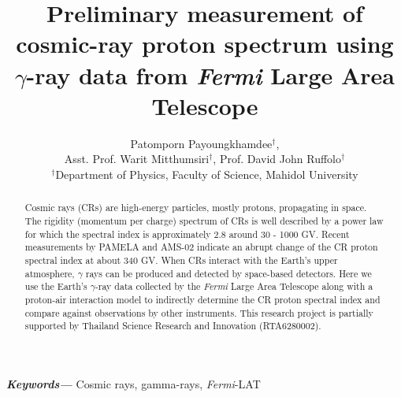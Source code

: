 \documentclass[a4paper, 12pt]{article}
\title{Preliminary measurement of cosmic-ray proton spectrum using $\gamma$-ray data from {\it Fermi} Large Area Telescope}
\author{
  Patomporn Payoungkhamdee$^{\dagger}$,\\
  Asst. Prof. Warit Mitthumsiri$^{\dagger}$, Prof. David John Ruffolo$^{\dagger}$\\
  \small $^{\dagger}$Department of Physics, Faculty of Science, Mahidol University
}
\date{} %
\providecommand{\keywords}[1]
{
  \small	
  \textbf{\textit{Keywords---}} #1
}
\begin{document}
\maketitle

\begin{abstract}
\normalsize

Cosmic rays (CRs) are high-energy particles, mostly protons, propagating in space. The rigidity (momentum per charge) spectrum of CRs is well described by a power law for which the spectral index is approximately 2.8 around 30 - 1000 GV. Recent measurements by PAMELA and AMS-02 indicate an abrupt change of the CR proton spectral index at about 340 GV. When CRs interact with the Earth's upper atmosphere, $\gamma$ rays can be produced and detected by space-based detectors. Here we use the Earth's $\gamma$-ray data collected by the {\it Fermi} Large Area Telescope along with a proton-air interaction model to indirectly determine the CR proton spectral index and compare against observations by other instruments.
This research project is partially supported by Thailand Science Research and Innovation (RTA6280002).

\end{abstract}
\hspace{10pt}

\keywords{ Cosmic rays, gamma-rays, {\it Fermi}-LAT}



\end{document}
